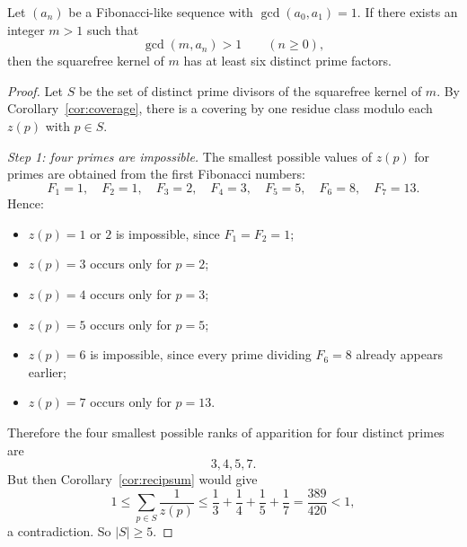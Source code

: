 \begin{theorem}\label{thm:sixprimes}
Let $(a_n)$ be a Fibonacci-like sequence with $\gcd(a_0,a_1)=1$. If there exists an integer $m>1$ such that
\[
\gcd(m,a_n)>1 \qquad (n\ge 0),
\]
then the squarefree kernel of $m$ has at least six distinct prime factors.
\end{theorem}
\begin{proof}
Let $S$ be the set of distinct prime divisors of the squarefree kernel of $m$. By Corollary~\ref{cor:coverage}, there is a covering by one residue class modulo each $z(p)$ with $p\in S$.

\smallskip
\noindent\emph{Step 1: four primes are impossible.}
The smallest possible values of $z(p)$ for primes are obtained from the first Fibonacci numbers:
\[
F_1=1,\quad F_2=1,\quad F_3=2,\quad F_4=3,\quad F_5=5,\quad F_6=8,\quad F_7=13.
\]
Hence:
\begin{itemize}
\item $z(p)=1$ or $2$ is impossible, since $F_1=F_2=1$;
\item $z(p)=3$ occurs only for $p=2$;
\item $z(p)=4$ occurs only for $p=3$;
\item $z(p)=5$ occurs only for $p=5$;
\item $z(p)=6$ is impossible, since every prime dividing $F_6=8$ already appears earlier;
\item $z(p)=7$ occurs only for $p=13$.
\end{itemize}
Therefore the four smallest possible ranks of apparition for four distinct primes are
\[
3,4,5,7.
\]
But then Corollary~\ref{cor:recipsum} would give
\[
1\le \sum_{p\in S}\frac1{z(p)}\le \frac13+\frac14+\frac15+\frac17=\frac{389}{420}<1,
\]
a contradiction. So $|S|\ge 5$.


\end{proof}
